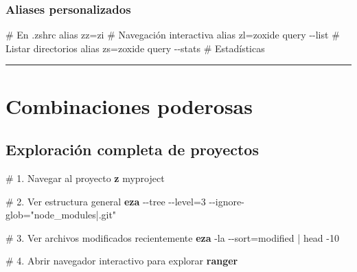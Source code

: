 \documentclass[
  11pt,
  letterpaper,
  oneside,
  openany]{scrbook}
\newenvironment{Shaded}{}{}
\newcommand{\AttributeTok}[1]{\textcolor[rgb]{0.84,0.23,0.29}{#1}}
\newcommand{\BuiltInTok}[1]{\textcolor[rgb]{0.84,0.23,0.29}{#1}}
\newcommand{\CommentTok}[1]{\textcolor[rgb]{0.42,0.45,0.49}{#1}}
\newcommand{\ExtensionTok}[1]{\textcolor[rgb]{0.84,0.23,0.29}{\textbf{#1}}}
\newcommand{\FunctionTok}[1]{\textcolor[rgb]{0.44,0.26,0.76}{#1}}
\newcommand{\KeywordTok}[1]{\textcolor[rgb]{0.84,0.23,0.29}{#1}}
\newcommand{\NormalTok}[1]{\textcolor[rgb]{0.14,0.16,0.18}{#1}}
\newcommand{\OperatorTok}[1]{\textcolor[rgb]{0.14,0.16,0.18}{#1}}
\newcommand{\StringTok}[1]{\textcolor[rgb]{0.01,0.18,0.38}{#1}}
\begin{document}
\subsubsection{Aliases personalizados}\label{aliases-personalizados}

\begin{Shaded}
\begin{Highlighting}[]
\CommentTok{\# En .zshrc}
\BuiltInTok{alias}\NormalTok{ zz=}\StringTok{\textquotesingle{}zi\textquotesingle{}}  \CommentTok{\# Navegación interactiva}
\BuiltInTok{alias}\NormalTok{ zl=}\StringTok{\textquotesingle{}zoxide query {-}{-}list\textquotesingle{}}  \CommentTok{\# Listar directorios}
\BuiltInTok{alias}\NormalTok{ zs=}\StringTok{\textquotesingle{}zoxide query {-}{-}stats\textquotesingle{}}  \CommentTok{\# Estadísticas}
\end{Highlighting}
\end{Shaded}

\begin{center}\rule{0.5\linewidth}{0.5pt}\end{center}

\section{Combinaciones poderosas}\label{combinaciones-poderosas-1}

\subsection{Exploración completa de
proyectos}\label{exploraciuxf3n-completa-de-proyectos}

\begin{Shaded}
\begin{Highlighting}[]
\CommentTok{\# 1. Navegar al proyecto}
\ExtensionTok{z}\NormalTok{ myproject}

\CommentTok{\# 2. Ver estructura general}
\ExtensionTok{eza} \AttributeTok{{-}{-}tree} \AttributeTok{{-}{-}level}\OperatorTok{=}\NormalTok{3 }\AttributeTok{{-}{-}ignore{-}glob}\OperatorTok{=}\StringTok{"node\_modules|.git"}

\CommentTok{\# 3. Ver archivos modificados recientemente}
\ExtensionTok{eza} \AttributeTok{{-}la} \AttributeTok{{-}{-}sort}\OperatorTok{=}\NormalTok{modified }\KeywordTok{|} \FunctionTok{head} \AttributeTok{{-}10}

\CommentTok{\# 4. Abrir navegador interactivo para explorar}
\ExtensionTok{ranger}
\end{Highlighting}
\end{Shaded}
\end{document}
